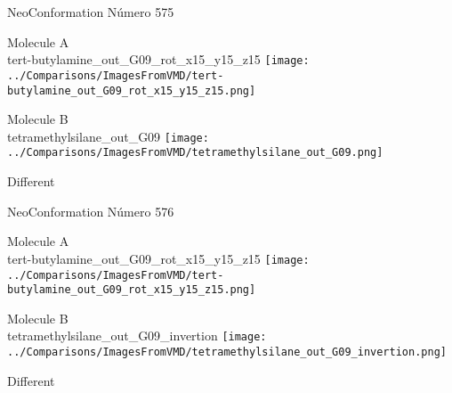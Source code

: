  \newpage

\vtab[-3cm]
\begin{center}
{\large NeoConformation \tab Número 575}
\end{center}
\begin{multicols}{2}
\begin{center}
Molecule A \\ 
tert-butylamine\_out\_G09\_rot\_x15\_y15\_z15
\texttt{[image: ../Comparisons/ImagesFromVMD/tert-butylamine\_out\_G09\_rot\_x15\_y15\_z15.png]}
\\
\vtab

\columnbreak
Molecule B \\ 
tetramethylsilane\_out\_G09
\texttt{[image: ../Comparisons/ImagesFromVMD/tetramethylsilane\_out\_G09.png]}
\\
\vtab


\end{center}
\end{multicols}
\begin{center}
\textcolor{NavyBlue}{\Large Different}
\end{center}

 \newpage

\vtab[-3cm]
\begin{center}
{\large NeoConformation \tab Número 576}
\end{center}
\begin{multicols}{2}
\begin{center}
Molecule A \\ 
tert-butylamine\_out\_G09\_rot\_x15\_y15\_z15
\texttt{[image: ../Comparisons/ImagesFromVMD/tert-butylamine\_out\_G09\_rot\_x15\_y15\_z15.png]}
\\
\vtab

\columnbreak
Molecule B \\ 
tetramethylsilane\_out\_G09\_invertion
\texttt{[image: ../Comparisons/ImagesFromVMD/tetramethylsilane\_out\_G09\_invertion.png]}
\\
\vtab


\end{center}
\end{multicols}
\begin{center}
\textcolor{NavyBlue}{\Large Different}
\end{center}

 \newpage

